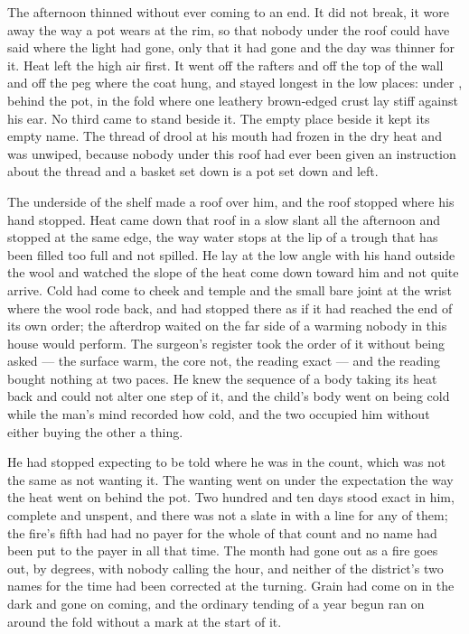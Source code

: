The afternoon thinned without ever coming to an end. It did not break, it wore away the way a pot wears at the rim, so that nobody under the roof could have said where the light had gone, only that it had gone and the day was thinner for it. Heat left the high air first. It went off the rafters and off the top of the wall and off the peg where the coat hung, and stayed longest in the low places: under , behind the pot, in the fold where one leathery brown-edged crust lay stiff against his ear. No third came to stand beside it. The empty place beside it kept its empty name. The thread of drool at his mouth had frozen in the dry heat and was unwiped, because nobody under this roof had ever been given an instruction about the thread and a basket set down is a pot set down and left.

The underside of the shelf made a roof over him, and the roof stopped where his hand stopped. Heat came down that roof in a slow slant all the afternoon and stopped at the same edge, the way water stops at the lip of a trough that has been filled too full and not spilled. He lay at the low angle with his hand outside the wool and watched the slope of the heat come down toward him and not quite arrive. Cold had come to cheek and temple and the small bare joint at the wrist where the wool rode back, and had stopped there as if it had reached the end of its own order; the afterdrop waited on the far side of a warming nobody in this house would perform. The surgeon's register took the order of it without being asked --- the surface warm, the core not, the reading exact --- and the reading bought nothing at two paces. He knew the sequence of a body taking its heat back and could not alter one step of it, and the child's body went on being cold while the man's mind recorded how cold, and the two occupied him without either buying the other a thing.

He had stopped expecting to be told where he was in the count, which was not the same as not wanting it. The wanting went on under the expectation the way the heat went on behind the pot. Two hundred and ten days stood exact in him, complete and unspent, and there was not a slate in  with a line for any of them; the fire's fifth had had no payer for the whole of that count and no name had been put to the payer in all that time. The month had gone out as a fire goes out, by degrees, with nobody calling the hour, and neither of the district's two names for the time had been corrected at the turning. Grain had come on in the dark and gone on coming, and the ordinary tending of a year begun ran on around the fold without a mark at the start of it.

